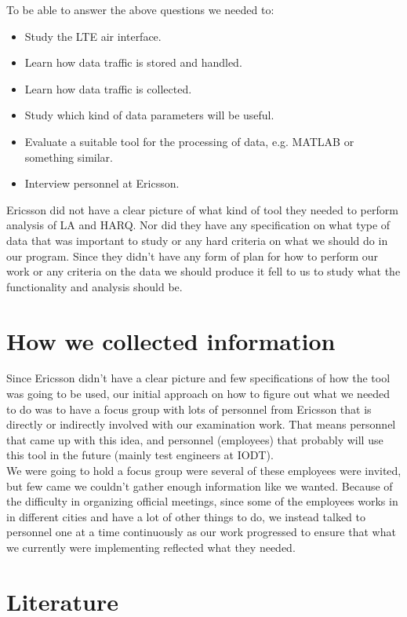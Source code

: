 \documentclass[cropmarks, frame, english]{idamasterthesis}
\begin{document}
To be able to answer the above questions we needed to:
\begin{itemize}
\item Study the LTE air interface.
\item Learn how data traffic is stored and handled.
\item Learn how data traffic is collected.
\item Study which kind of data parameters will be useful.
\item Evaluate a suitable tool for the processing of data, e.g. MATLAB or something similar.
\item Interview personnel at Ericsson.
\end{itemize}


Ericsson did not have a clear picture of what kind of tool they needed to perform analysis of LA and HARQ. Nor did they have any specification on what type of data that was important to study or any hard criteria on what we should do in our program. Since they didn't have any form of plan for how to perform our work or any criteria on the data we should produce it fell to us to study what the functionality and analysis should be.


\section{How we collected information}
Since Ericsson didn't have a clear picture and few specifications of how the tool was going to be used, our initial approach on how to figure out what we needed to do was to have a focus group with lots of personnel from Ericsson that is directly or indirectly involved with our examination work. That means personnel that came up with this idea, and personnel (employees) that probably will use this tool in the future (mainly test engineers at IODT). \\

We were going to hold a focus group were several of these employees were invited, but few came we couldn't gather enough information like we wanted. Because of the difficulty in organizing official meetings, since some of the employees works in in different cities and have a lot of other things to do, we instead talked to personnel one at a time continuously as our work progressed to ensure that what we currently were implementing reflected what they needed.

\section{Literature}
\end{document}
